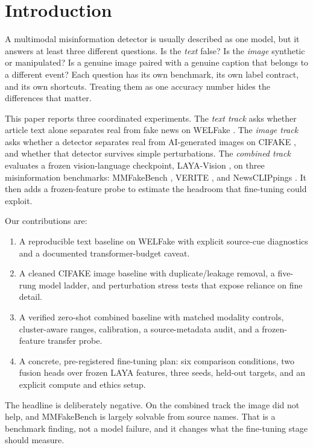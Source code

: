 \documentclass[11pt]{article}
\begin{document}
\section{Introduction}

A multimodal misinformation detector is usually described as one model, but it answers at least three different questions. Is the \emph{text} false? Is the \emph{image} synthetic or manipulated? Is a genuine image paired with a genuine caption that belongs to a different event? Each question has its own benchmark, its own label contract, and its own shortcuts. Treating them as one accuracy number hides the differences that matter.

This paper reports three coordinated experiments. The \emph{text track} asks whether article text alone separates real from fake news on WELFake \cite{welfake}. The \emph{image track} asks whether a detector separates real from AI-generated images on CIFAKE \cite{cifake}, and whether that detector survives simple perturbations. The \emph{combined track} evaluates a frozen vision-language checkpoint, LAYA-Vision \cite{laya}, on three misinformation benchmarks: MMFakeBench \cite{mmfakebench}, VERITE \cite{verite}, and NewsCLIPpings \cite{newsclippings}. It then adds a frozen-feature probe to estimate the headroom that fine-tuning could exploit.

Our contributions are:
\begin{enumerate}[leftmargin=1.4em,itemsep=2pt]
  \item A reproducible text baseline on WELFake with explicit source-cue diagnostics and a documented transformer-budget caveat.
  \item A cleaned CIFAKE image baseline with duplicate/leakage removal, a five-rung model ladder, and perturbation stress tests that expose reliance on fine detail.
  \item A verified zero-shot combined baseline with matched modality controls, cluster-aware ranges, calibration, a source-metadata audit, and a frozen-feature transfer probe.
  \item A concrete, pre-registered fine-tuning plan: six comparison conditions, two fusion heads over frozen LAYA features, three seeds, held-out targets, and an explicit compute and ethics setup.
\end{enumerate}

The headline is deliberately negative. On the combined track the image did not help, and MMFakeBench is largely solvable from source names. That is a benchmark finding, not a model failure, and it changes what the fine-tuning stage should measure.
\end{document}

